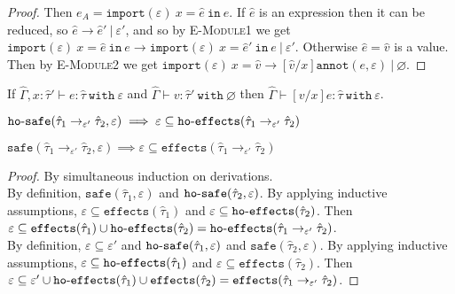 \documentclass{llncs}
\newcommand{\keywadj}[1]{\mathtt{#1}}
\newcommand{\keyw}[1]{\keywadj{#1}~}
\newcommand{\kw}[1]{\keyw{ #1 }}
\newcommand{\kwa}[1]{\keywadj{ #1 }}
\newcommand{\hyphen}{\hbox{-}}
\newcommand{\module}[0]{
\kwa{import}(\varepsilon)~x = \hat e~\kwa{in}~e
}
\begin{document}
\begin{proof}
\noindent
{}
Then $e_A = \module$. If $\hat e$ is an expression then it can be reduced, so $\hat e \longrightarrow \hat e' ~|~\varepsilon'$, and so by \textsc{E-Module1} we get $\module \longrightarrow \kwa{import}(\varepsilon)~x = \hat e'~\kw{in} e ~|~\varepsilon'$. Otherwise $\hat e = \hat v$ is a value. Then by \textsc{E-Module2} we get $\kwa{import}(\varepsilon)~x = \hat v \longrightarrow [\hat v/x]\kwa{annot}(e, \varepsilon)~|~\varnothing$.
\end{proof}

\hrulefill

\begin{lemma}[Substitution]
If $\hat \Gamma, x: \hat \tau' \vdash e: \hat \tau~\kw{with} \varepsilon$ and $\hat \Gamma \vdash v: \hat \tau'~\kw{with} \varnothing$ then $\hat \Gamma \vdash [v/x]e: \hat \tau~\kw{with} \varepsilon$.
\end{lemma}

\hrulefill

\begin{lemma}
$\kwa{ho \hyphen safe}(\hat \tau_1 \rightarrow_{\varepsilon'} \hat \tau_2, \varepsilon) \implies \varepsilon \subseteq \kwa{ho \hyphen effects}(\hat \tau_1 \rightarrow_{\varepsilon'} \hat \tau_2)$
\end{lemma}

\begin{lemma}
$\kwa{safe}(\hat \tau_1 \rightarrow_{\varepsilon'} \hat \tau_2, \varepsilon) \implies \varepsilon \subseteq \kwa{effects}(\hat \tau_1 \rightarrow_{\varepsilon'} \hat \tau_2)$
\end{lemma}

\begin{proof}
By simultaneous induction on derivations. \\

\noindent
\fbox{$\kwa{ho \hyphen safe}(\hat \tau_1 \rightarrow_{\varepsilon'} \hat \tau_2, \varepsilon)$} By definition, $\kwa{safe}(\hat \tau_1, \varepsilon)$ and $\kwa{ho \hyphen safe}(\hat \tau_2, \varepsilon)$. By applying inductive assumptions, $\varepsilon \subseteq \kwa{effects}(\hat \tau_1)$ and $\varepsilon \subseteq \kwa{ho \hyphen effects}(\hat \tau_2)$. Then $\varepsilon \subseteq \kwa{effects}(\hat \tau_1) \cup \kwa{ho \hyphen effects}(\hat \tau_2) = \kwa{ho \hyphen effects}(\hat \tau_1 \rightarrow_{\varepsilon'} \hat \tau_2)$. \\

\noindent
\fbox{$\kwa{safe}(\hat \tau_1 \rightarrow_{\varepsilon'} \hat \tau_2, \varepsilon)$} By definition, $\varepsilon \subseteq \varepsilon'$ and $\kwa{ho \hyphen safe}(\hat \tau_1, \varepsilon)$ and $\kwa{safe}(\hat \tau_2, \varepsilon)$. By applying inductive assumptions, $\varepsilon \subseteq \kwa{ho \hyphen effects}(\hat \tau_1)$ and $\varepsilon \subseteq \kwa{effects}(\hat \tau_2)$. Then $\varepsilon \subseteq \varepsilon' \cup \kwa{ho \hyphen effects}(\hat \tau_1) \cup \kwa{effects}(\hat \tau_2) = \kwa{effects}(\hat \tau_1 \rightarrow_{\varepsilon'} \hat \tau_2)$.
\end{proof}
\end{document}
